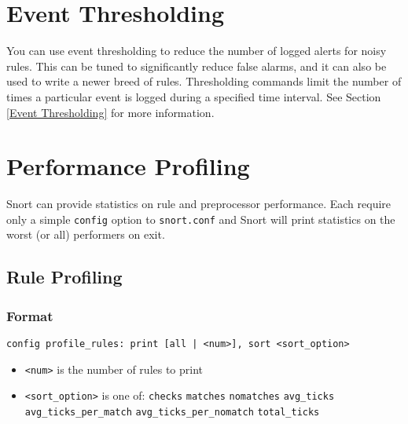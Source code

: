 \documentclass[english]{report}
\begin{document}
%
%
%
%
%
%
%
%    

\section{Event Thresholding}
You can use event thresholding to reduce the number of logged alerts for noisy
rules.  This can be tuned to significantly reduce false alarms, and it can also
be used to write a newer breed of rules. Thresholding commands limit the number
of times a particular event is logged during a specified time interval. See Section \ref{Event Thresholding} for more information.

\section{Performance Profiling}

Snort can provide statistics on rule and preprocessor performance.  Each require only a
simple \texttt{config} option to \texttt{snort.conf} and Snort will print statistics on the worst (or all) performers
on exit.

\subsection{Rule Profiling\label{rule profiling}}

\subsubsection{Format}
\texttt{config profile\_rules: print [all | <num>], sort <sort\_option>}
\begin{itemize}
\item \texttt{<num>} is the number of rules to print
\item \texttt{<sort\_option>} is one of:
    \subitem \texttt{checks}
    \subitem \texttt{matches}
    \subitem \texttt{nomatches}
    \subitem \texttt{avg\_ticks}
    \subitem \texttt{avg\_ticks\_per\_match}
    \subitem \texttt{avg\_ticks\_per\_nomatch}
    \subitem \texttt{total\_ticks}
\end{itemize}
\end{document}
